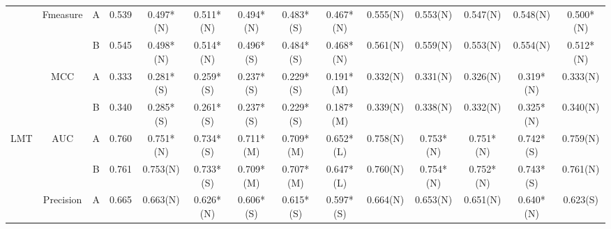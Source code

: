 \begin{table*}
{\begin{tabular}{|c|c|c|c|c|c|c|c|c|c|c|c|c|c|}
                      & \multirow{2}{*}{Fmeasure}  & A                                                                             & 0.539         & 0.497*(N)            & 0.511*(N)        & 0.494*(N)       & 0.483*(S)       & 0.467*(N)         & 0.555(N)        & 0.553(N)       & 0.547(N)       & 0.548(N)         & 0.500*(N)       \\ \cline{3-14} 
                      &                            & B                                                                             & 0.545         & 0.498*(N)            & 0.514*(N)        & 0.496*(S)       & 0.484*(S)       & 0.468*(N)         & 0.561(N)        & 0.559(N)       & 0.553(N)       & 0.554(N)         & 0.512*(N)     \\ \cline{2-14} 
                      & \multirow{2}{*}{MCC}       & A                                                                             & 0.333         & 0.281*(S)            & 0.259*(S)        & 0.237*(S)       & 0.229*(S)       & 0.191*(M)         & 0.332(N)        & 0.331(N)       & 0.326(N)       & 0.319*(N)        & 0.333(N)      \\ \cline{3-14} 
                      &                            & B                                                                             & 0.340          & 0.285*(S)            & 0.261*(S)        & 0.237*(S)       & 0.229*(S)       & 0.187*(M)         & 0.339(N)        & 0.338(N)       & 0.332(N)       & 0.325*(N)        & 0.340(N)       \\ \hline
\multirow{10}{*}{LMT} & \multirow{2}{*}{AUC}       & A                                                                             & 0.760          & 0.751*(N)            & 0.734*(S)        & 0.711*(M)       & 0.709*(M)       & 0.652*(L)         & 0.758(N)        & 0.753*(N)      & 0.751*(N)      & 0.742*(S)        & 0.759(N)      \\ \cline{3-14} 
                      &                            & B                                                                             & 0.761         & 0.753(N)             & 0.733*(S)        & 0.709*(M)       & 0.707*(M)       & 0.647*(L)         & 0.760(N)         & 0.754*(N)      & 0.752*(N)      & 0.743*(S)        & 0.761(N)      \\ \cline{2-14} 
                      & \multirow{2}{*}{Precision} & A                                                                             & 0.665         & 0.663(N)             & 0.626*(N)        & 0.606*(S)       & 0.615*(S)       & 0.597*(S)         & 0.664(N)        & 0.653(N)       & 0.651(N)       & 0.640*(N)         & 0.623(S)      \\ \cline{3-14} 

\end{tabular}}
\end{table*}
